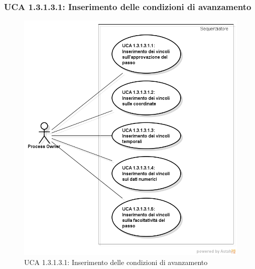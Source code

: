 \subsubsection{UCA 1.3.1.3.1: Inserimento delle condizioni di avanzamento}
\begin{figure}[H]
\centering
\includegraphics[trim=0cm 0.8cm 0cm 0cm,clip=true,width=%
\textwidth]
{./grafici/A13131}
\caption{UCA 1.3.1.3.1: Inserimento delle condizioni di avanzamento}
\end{figure}
